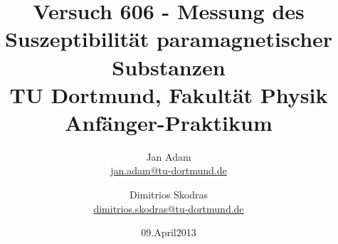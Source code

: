 



\title{Versuch 606 - Messung des Suszeptibilität paramagnetischer Substanzen\\				%
\large TU Dortmund, Fakultät Physik\\ 
\normalsize Anfänger-Praktikum}

\author{Jan Adam\\			%
{\small \href{jan.adam@tu-dortmund.de}{jan.adam@tu-dortmund.de}}	%
\and						%
Dimitrios Skodras\\					%
{\small \href{dimitrios.skodras@tu-dortmund.de}{dimitrios.skodras@tu-dortmund.de}}		%
}
\date{09.April2013}				%





\maketitle					%
\thispagestyle{empty} 				%



\tableofcontents


\newpage					%


